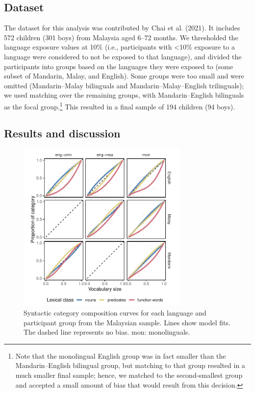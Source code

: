 \documentclass[10pt, letterpaper]{article}
\begin{document}
\subsection{Dataset}\label{dataset}

The dataset for this analysis was contributed by Chai et al. (2021). It
includes 572 children (301 boys) from Malaysia aged 6--72 months. We
thresholded the language exposure values at 10\% (i.e., participants
with \textless10\% exposure to a language were considered to not be
exposed to that language), and divided the participants into groups
based on the languages they were exposed to (some subset of Mandarin,
Malay, and English). Some groups were too small and were omitted
(Mandarin--Malay bilinguals and Mandarin--Malay--English trilinguals);
we used matching over the remaining groups, with Mandarin--English
bilinguals as the focal group.\footnote{Note that the monolingual
  English group was in fact smaller than the Mandarin--English bilingual
  group, but matching to that group resulted in a much smaller final
  sample; hence, we matched to the second-smallest group and accepted a
  small amount of bias that would result from this decision.} This
resulted in a final sample of 194 children (94 boys).

\subsection{Results and discussion}\label{results-and-discussion}

\begin{CodeChunk}
\begin{figure}[t]

{\centering \includegraphics[width=240pt]{figs/my_prop-1} 

}

\caption[Syntactic category composition curves for each language and participant group from the Malaysian sample]{Syntactic category composition curves for each language and participant group from the Malaysian sample. Lines show model fits. The dashed line represents no bias. mon: monolinguals.}\label{fig:my_prop}
\end{figure}
\end{CodeChunk}
\end{document}
